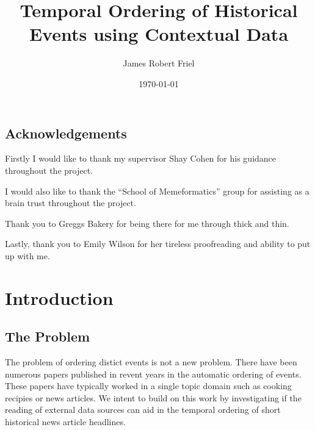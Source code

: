 \documentclass[bsc,frontabs,twoside,singlespacing,parskip,deptreport]{infthesis}     %
\begin{document}
\title{Temporal Ordering of Historical Events using Contextual Data}

\author{James Robert Friel}
 

\date{\today}

\abstract{}


\maketitle

\section*{Acknowledgements}
Firstly I would like to thank my supervisor Shay Cohen for his guidance throughout the project.

I would also like to thank the ``School of Memeformatics'' group for assisting as a brain trust
throughout the project.

Thank you to Greggs Bakery for being there for me through thick and thin.

Lastly, thank you to Emily Wilson for her tireless proofreading and ability to put up with me.

\tableofcontents



\chapter{Introduction}
\section{The Problem}
The problem of ordering distict events is not a new problem. There have been numerous papers published
in revent years in the automatic ordering of events. These papers have typically worked in a single
topic domain such as cooking recipies or news articles. We intent to build on this work by
investigating if the reading of external data sources can aid in the temporal ordering of short
historical news article headlines.
\end{document}
